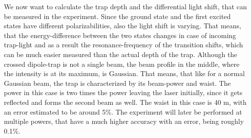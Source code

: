 We now want to calculate the trap depth and the differential light shift, that can be measured in the experiment. Since the ground state and the first excited states have different polarizabilities, also the light shift is varying. That means, that the energy-difference between the two states changes in case of incoming trap-light and as a result the resonance-frequency of the transition shifts, which can be much easier measured than the actual depth of the trap. Although the crossed dipole-trap is not a single beam, the beam profile in the middle, where the intensity is at its maximum, is Gaussian. That means, that like for a normal Gaussian beam, the trap is characterized by its beam-power and waist. The power in this case is two times the power leaving the laser initially, since it gets reflected and forms the second beam as well. The waist in this case is 40 \mu m, with an error estimated to be around 5\%. The experiment will later be performed at multiple powers, that have a much higher accuracy with an error, being roughly 0.1\%.
